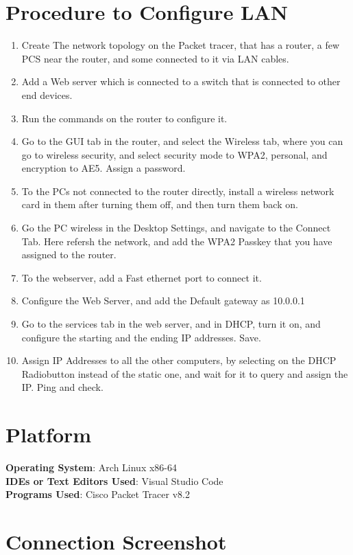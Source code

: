 \documentclass[11pt]{article}
\begin{document}
	\section{Procedure to Configure LAN}
\begin{enumerate}
	\item Create The network topology on the Packet tracer, that has a router, a few PCS near the router, and some connected to it via LAN cables. 
	\item Add a Web server which is connected to a switch that is connected to other end devices. 
	\item Run the commands on the router to configure it. 
	\item Go to the GUI tab in the router, and select the Wireless tab, where you can go to wireless security, and select security mode to WPA2, personal, and encryption to AE5. Assign a password. 
	\item To the PCs not connected to the router directly, install a wireless network card in them after turning them off, and then turn them back on. 
	\item Go the PC wireless in the Desktop Settings, and navigate to the Connect Tab. Here refersh the network, and add the WPA2 Passkey that you have assigned to the router. 
	\item To the webserver, add a Fast ethernet port to connect it. 
	\item Configure the Web Server, and add the Default gateway as 10.0.0.1
	\item Go to the services tab in the web server, and in DHCP, turn it on, and configure the starting and the ending IP addresses. Save. 
	\item Assign IP Addresses to all the other computers, by selecting on the DHCP Radiobutton instead of the static one, and wait for it to query and assign the IP. Ping and check. 
\end{enumerate}

\section{Platform}
	\textbf{Operating System}: Arch Linux x86-64\\
	\textbf{IDEs or Text Editors Used}: Visual Studio Code\\
	\textbf{Programs Used}: Cisco Packet Tracer v8.2

\section{Connection Screenshot}
\end{document}
